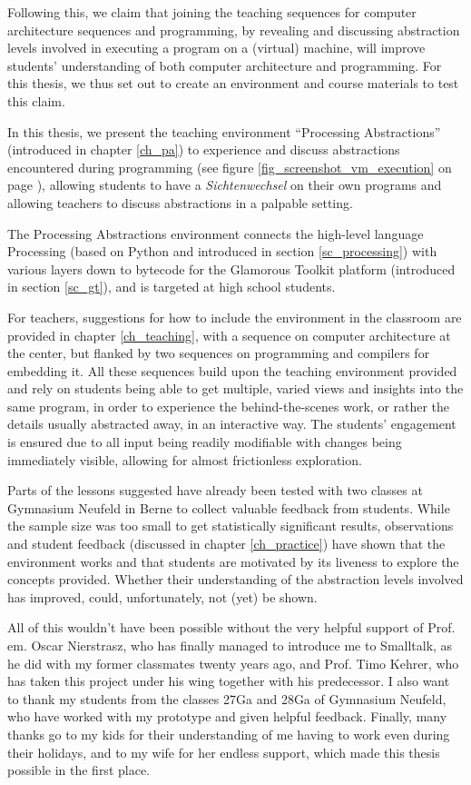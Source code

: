 Following this, we claim that joining the teaching sequences for computer architecture sequences and programming, by revealing and discussing abstraction levels involved in executing a program on a (virtual) machine, will improve students' understanding of both computer architecture and programming. For this thesis, we thus set out to create an environment and course materials to test this claim.

In this thesis, we present the teaching environment ``Processing Abstractions'' (introduced in chapter \ref{ch_pa}) to experience and discuss abstractions encountered during programming (see \eg figure \ref{fig_screenshot_vm_execution} on page \pageref{fig_screenshot_vm_execution}), allowing students to have a \emph{Sichtenwechsel} on their own programs and allowing teachers to discuss abstractions in a palpable setting.

The Processing Abstractions environment connects the high-level language Processing (based on Python and introduced in section \ref{sc_processing}) with various layers down to bytecode for the Glamorous Toolkit platform (introduced in section \ref{sc_gt}), and is targeted at high school students.

For teachers, suggestions for how to include the environment in the classroom are provided in chapter \ref{ch_teaching}, with a sequence on computer architecture at the center, but flanked by two sequences on programming and compilers for embedding it. All these sequences build upon the teaching environment provided and rely on students being able to get multiple, varied views and insights into the same program, in order to experience the behind-the-scenes work, or rather the details usually abstracted away, in an interactive way. The students' engagement is ensured due to all input being readily modifiable with changes being immediately visible, allowing for almost frictionless exploration.

Parts of the lessons suggested have already been tested with two classes at Gymnasium Neufeld in Berne to collect valuable feedback from students. While the sample size was too small to get statistically significant results, observations and student feedback (discussed in chapter \ref{ch_practice}) have shown that the environment works and that students are motivated by its liveness to explore the concepts provided. Whether their understanding of the abstraction levels involved has improved, could, unfortunately, not (yet) be shown.

All of this wouldn't have been possible without the very helpful support of Prof.\,em. Oscar Nierstrasz, who has finally managed to introduce me to Smalltalk, as he did with my former classmates twenty years ago, and Prof. Timo Kehrer, who has taken this project under his wing together with his predecessor. I also want to thank my students from the classes 27Ga and 28Ga of Gymnasium Neufeld, who have worked with my prototype and given helpful feedback. Finally, many thanks go to my kids for their understanding of me having to work even during their holidays, and to my wife for her endless support, which made this thesis possible in the first place.
